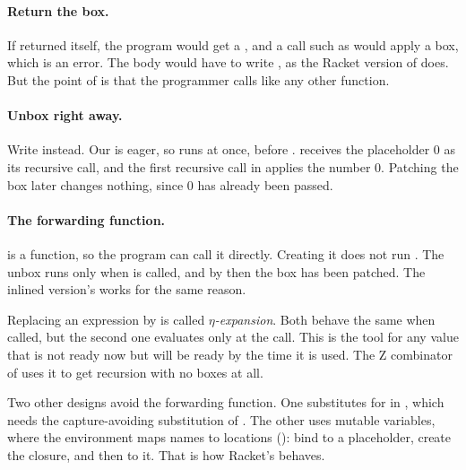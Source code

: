 \paragraph{Return the box.} If  returned  itself, the program would get a , and a call such as  would apply a box, which is an error. The body would have to write , as the Racket version of  does. But the point of  is that the programmer calls  like any other function.

\paragraph{Unbox right away.} Write  instead. Our  is eager, so  runs at once, before .  receives the placeholder 0 as its recursive call, and the first recursive call in  applies the number 0. Patching the box later changes nothing, since 0 has already been passed.

\paragraph{The forwarding function.}  is a function, so the program can call it directly. Creating it does not run . The unbox runs only when  is called, and by then the box has been patched. The inlined version's  works for the same reason.

\begin{keypoint}
Replacing an expression  by  is called \emph{$\eta$-expansion}. Both behave the same when called, but the second one evaluates  only at the call. This is the tool for any value that is not ready now but will be ready by the time it is used. The Z combinator of  uses it to get recursion with no boxes at all.
\end{keypoint}

\begin{remark}
Two other designs avoid the forwarding function. One substitutes  for  in , which needs the capture-avoiding substitution of . The other uses mutable variables, where the environment maps names to locations (): bind  to a placeholder, create the closure, and then   to it. That is how Racket's  behaves.
\end{remark}
